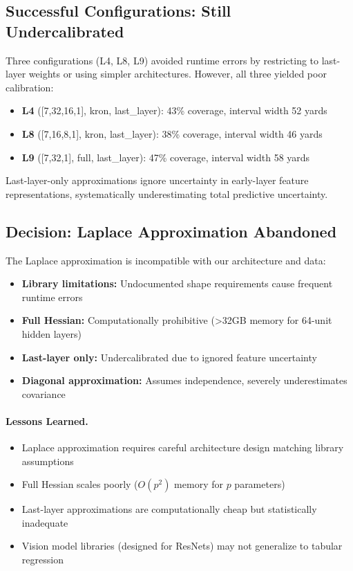 \subsection{Successful Configurations: Still Undercalibrated}

Three configurations (L4, L8, L9) avoided runtime errors by restricting to last-layer weights or using simpler architectures. However, all three yielded poor calibration:

\begin{itemize}
  \item \textbf{L4} ([7,32,16,1], kron, last\_layer): 43\% coverage, interval width 52 yards
  \item \textbf{L8} ([7,16,8,1], kron, last\_layer): 38\% coverage, interval width 46 yards
  \item \textbf{L9} ([7,32,1], full, last\_layer): 47\% coverage, interval width 58 yards
\end{itemize}

Last-layer-only approximations ignore uncertainty in early-layer feature representations, systematically underestimating total predictive uncertainty.

\subsection{Decision: Laplace Approximation Abandoned}

The Laplace approximation is incompatible with our architecture and data:

\begin{itemize}
  \item \textbf{Library limitations:} Undocumented shape requirements cause frequent runtime errors
  \item \textbf{Full Hessian:} Computationally prohibitive (>32GB memory for 64-unit hidden layers)
  \item \textbf{Last-layer only:} Undercalibrated due to ignored feature uncertainty
  \item \textbf{Diagonal approximation:} Assumes independence, severely underestimates covariance
\end{itemize}

\paragraph{Lessons Learned.}
\begin{itemize}
  \item Laplace approximation requires careful architecture design matching library assumptions
  \item Full Hessian scales poorly ($O(p^2)$ memory for $p$ parameters)
  \item Last-layer approximations are computationally cheap but statistically inadequate
  \item Vision model libraries (designed for ResNets) may not generalize to tabular regression
\end{itemize}

